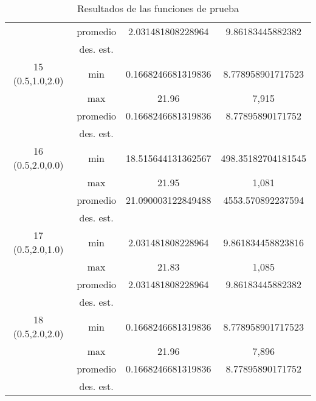 \documentclass{report}
\begin{document}
\begin{table}[H]
\begin{tabular}{|c|c|c|c|}
                              & promedio                    &     2.031481808228964       &    9.86183445882382    \\ \cline{2-4} 
                              & des. est.                   &            &        \\ \hline
        15 (0.5,1.0,2.0)                   & min                         &     0.1668246681319836       &   8.778958901717523     \\ \cline{2-4} 
                              & max                         &      21.96      &    7,915    \\ \cline{2-4} 
                              & promedio                    &      0.1668246681319836      &   8.77895890171752     \\ \cline{2-4} 
                              & des. est.                   &            &        \\ \hline
        16 (0.5,2.0,0.0)                   & min                         &      18.515644131362567      &    498.35182704181545    \\ \cline{2-4} 
                              & max                         &       21.95     &   1,081     \\ \cline{2-4} 
                              & promedio                    &     21.090003122849488       &   4553.570892237594     \\ \cline{2-4} 
                              & des. est.                   &            &        \\ \hline
        17 (0.5,2.0,1.0)                   & min                         &      2.031481808228964      &    9.861834458823816    \\ \cline{2-4} 
                              & max                         &       21.83     &    1,085    \\ \cline{2-4} 
                              & promedio                    &        2.031481808228964    &    9.86183445882382    \\ \cline{2-4} 
                              & des. est.                   &            &        \\ \hline
        18 (0.5,2.0,2.0)                   & min                         &     0.1668246681319836       &    8.778958901717523    \\ \cline{2-4} 
                              & max                         &      21.96      &     7,896   \\ \cline{2-4} 
                              & promedio                    &      0.1668246681319836      &    8.77895890171752    \\ \cline{2-4} 
                              & des. est.                   &            &        \\ \hline

        \end{tabular}
        \caption{Resultados de las funciones de prueba}
        \label{tab:resultados 2}
    \end{table}
\end{document}
